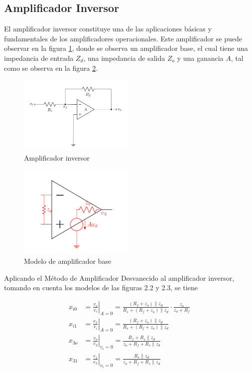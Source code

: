 \subsection{Amplificador Inversor}

El amplificador inversor constituye una de las aplicaciones básicas y fundamentales de los amplificadores operacionales. Este amplificador se puede observar en la figura \ref{fig:mt-amplificador-inversor}, donde se observa un amplificador base, el cual tiene
una impedancia de entrada $Z_d$, una impedancia de salida $Z_o$ y una ganancia $A$, tal como se observa en la figura \ref{fig:mt-modelo-amp-base}.

\begin{figure}[ht]
    \centering
    \includegraphics[width=0.5\textwidth]{src/images/amplificador-inversor.png}
    \caption{Amplificador inversor}
    \label{fig:mt-amplificador-inversor}
\end{figure}

\begin{figure}[ht]
    \centering
    \includegraphics[width=0.5\textwidth]{src/images/modelo-amp-base.png}
    \caption{Modelo de amplificador base}
    \label{fig:mt-modelo-amp-base}
\end{figure}


Aplicando el Método de Amplificador Desvanecido al amplificador inversor, tomando en cuenta los modelos de las figuras 2.2 y 2.3, se tiene

\begin{align}
    x_{i0} &= \left. \frac{v_o}{v_i} \right|_{A=0} = \frac{(R_f + z_o) \parallel z_d}{R_s + (R_f + z_o) \parallel z_d} \cdot \frac{z_o}{z_o + R_f} \label{eq:mt-amp-inversor-i0} \\
    x_{i1} &= \left. \frac{e_1}{v_i} \right|_{A=0} = \frac{(R_f + z_o) \parallel z_d}{R_s + (R_f + z_o) \parallel z_d} \label{eq:mt-amp-inversor-i1} \\
    x_{3o} &= \left. \frac{v_o}{e_3} \right|_{v_i=0} = \frac{R_f + R_s \parallel z_d}{z_o + R_f + R_s \parallel z_d} \label{eq:mt-amp-inversor-3o} \\
    x_{31} &= \left. \frac{e_1}{e_3} \right|_{v_i=0} = \frac{R_s \parallel z_d}{z_o + R_f + R_s \parallel z_d} \label{eq:mt-amp-inversor-31}
\end{align}

